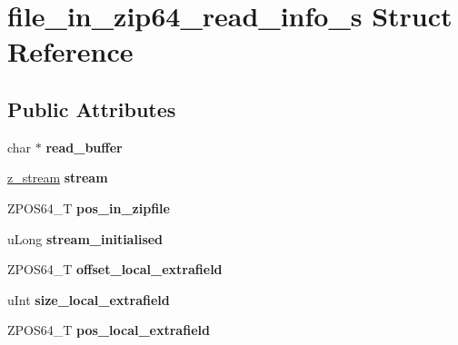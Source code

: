 \hypertarget{structfile__in__zip64__read__info__s}{}\section{file\+\_\+in\+\_\+zip64\+\_\+read\+\_\+info\+\_\+s Struct Reference}
\label{structfile__in__zip64__read__info__s}
\subsection*{Public Attributes}
\begin{DoxyCompactItemize}
\item 
\mbox{\label{structfile__in__zip64__read__info__s_a82f2e254f06f441f3dfcc549648239b5}} 
char $\ast$ {\bfseries read\+\_\+buffer}
\item 
\mbox{\label{structfile__in__zip64__read__info__s_a1826c0c38a41cfc6233e2e1e723d4cac}} 
\hyperlink{structz__stream__s}{z\+\_\+stream} {\bfseries stream}
\item 
\mbox{\label{structfile__in__zip64__read__info__s_a7f66f187144c9c6da0052016296c2469}} 
Z\+P\+O\+S64\+\_\+T {\bfseries pos\+\_\+in\+\_\+zipfile}
\item 
\mbox{\label{structfile__in__zip64__read__info__s_ae7351ca53dec98f5776930eee062498d}} 
u\+Long {\bfseries stream\+\_\+initialised}
\item 
\mbox{\label{structfile__in__zip64__read__info__s_a7e6c7e5e03308ba365f36f1ea6d4742d}} 
Z\+P\+O\+S64\+\_\+T {\bfseries offset\+\_\+local\+\_\+extrafield}
\item 
\mbox{\label{structfile__in__zip64__read__info__s_aad537b7873db8b26b7ca75c5cba2b192}} 
u\+Int {\bfseries size\+\_\+local\+\_\+extrafield}
\item 
\mbox{\label{structfile__in__zip64__read__info__s_af92c3da98b85512f95ba6b1254653c3e}} 
Z\+P\+O\+S64\+\_\+T {\bfseries pos\+\_\+local\+\_\+extrafield}

\end{DoxyCompactItemize}
